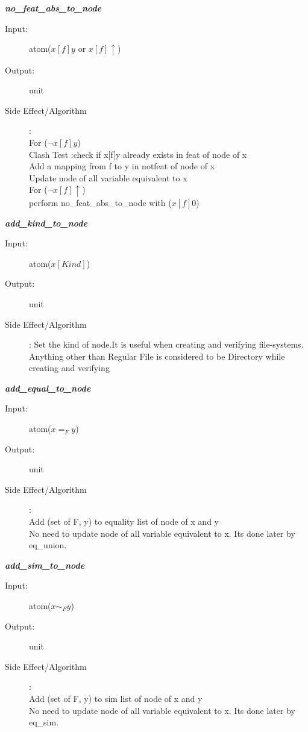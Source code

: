 \documentclass[12pt]{article}
\begin{document}
\begin{description}
\item \textbf{\textit{no\_feat\_abs\_to\_node}}
\begin{description}
    \item[Input:] atom($x[f]y$ or $x[f]\uparrow$)
    \item[Output:] unit
    \item[Side Effect/Algorithm]:\\For ($\lnot x[f]y$)\\ 
    Clash Test :check if x[f]y already exists in feat of node of x\\
    Add a mapping from f to y in notfeat of node of x\\
    Update node of all variable equivalent to x\\
    For ($\lnot x[f]\uparrow$)\\ perform no\_feat\_abs\_to\_node with ($x[f]0$)\\
\end{description}

\item \textbf{\textit{add\_kind\_to\_node}}
\begin{description}
    \item[Input:] atom($x[Kind]$)
    \item[Output:] unit
    \item[Side Effect/Algorithm]: Set the kind of node.It is useful when creating and verifying file-systems. Anything other than Regular File is considered to be Directory while creating and verifying
\end{description}

\item \textbf{\textit{add\_equal\_to\_node}}
\begin{description}
    \item[Input:] atom($x=_F y$)
    \item[Output:] unit
    \item[Side Effect/Algorithm]:\\Add (set of F, y) to equality list of node of x and y\\
    No need to update node of all variable equivalent to x. Its done later by eq\_union.\\
\end{description}

\item \textbf{\textit{add\_sim\_to\_node}}
\begin{description}
    \item[Input:] atom($x\sim_F y$)
    \item[Output:] unit
    \item[Side Effect/Algorithm]:\\Add (set of F, y) to sim list of node of x and y\\
    No need to update node of all variable equivalent to x. Its done later by eq\_sim.
\end{description}



\end{description}
\end{document}
